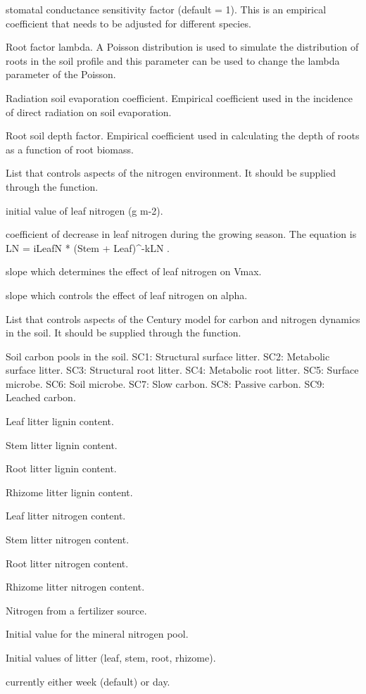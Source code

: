\documentclass[letterpaper]{book}
\begin{document}
\begin{Arguments}
\begin{ldescription}
 stomatal conductance sensitivity factor
(default = 1). This is an empirical coefficient that
needs to be adjusted for different species.

 Root factor lambda. A Poisson distribution is
used to simulate the distribution of roots in the soil
profile and this parameter can be used to change the
lambda parameter of the Poisson.

 Radiation soil evaporation coefficient.
Empirical coefficient used in the incidence of direct
radiation on soil evaporation.

 Root soil depth factor. Empirical coefficient
used in calculating the depth of roots as a function of
root biomass.

\item[\code{nitroControl}] List that controls aspects of the
nitrogen environment. It should be supplied through the
 function.

 initial value of leaf nitrogen (g m-2).

 coefficient of decrease in leaf nitrogen
during the growing season. The equation is LN = iLeafN *
(Stem + Leaf)\textasciicircum{}-kLN .

 slope which determines the effect of leaf
nitrogen on Vmax.

 slope which controls the effect of leaf
nitrogen on alpha.

\item[\code{centuryControl}] List that controls aspects of the
Century model for carbon and nitrogen dynamics in the
soil. It should be supplied through the
 function.

 Soil carbon pools in the soil.  SC1:
Structural surface litter.  SC2: Metabolic surface
litter.  SC3: Structural root litter.  SC4: Metabolic
root litter.  SC5: Surface microbe.  SC6: Soil microbe.
SC7: Slow carbon.  SC8: Passive carbon.  SC9: Leached
carbon.

 Leaf litter lignin content.

 Stem litter lignin content.

 Root litter lignin content.

 Rhizome litter lignin content.

 Leaf litter nitrogen content.

 Stem litter nitrogen content.

 Root litter nitrogen content.

 Rhizome litter nitrogen content.

 Nitrogen from a fertilizer source.

 Initial value for the mineral nitrogen pool.

 Initial values of litter (leaf, stem, root,
rhizome).

 currently either week (default) or day.
\end{ldescription}
\end{Arguments}
\end{document}
